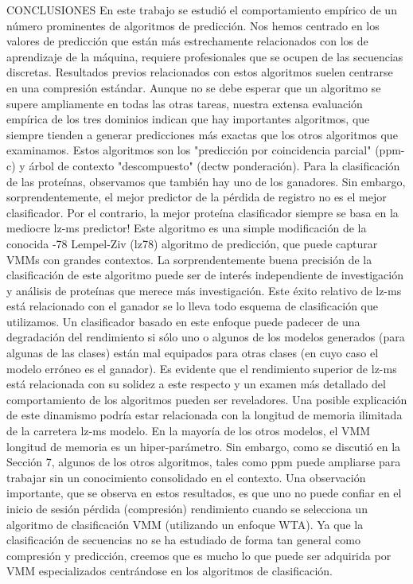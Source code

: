 CONCLUSIONES
En este trabajo se estudió el comportamiento empírico de un número  prominentes de algoritmos de predicción. Nos hemos centrado en los valores de predicción  que están más estrechamente relacionados con los de aprendizaje de la máquina, requiere profesionales que se ocupen de las secuencias discretas. Resultados previos relacionados con estos algoritmos suelen centrarse en una compresión estándar.
Aunque no se debe esperar que un algoritmo se supere ampliamente en todas las otras tareas, nuestra extensa evaluación empírica de los tres dominios indican que hay importantes algoritmos, que siempre tienden a generar predicciones más exactas que los otros algoritmos que examinamos. Estos algoritmos son los "predicción por coincidencia parcial" (ppm-c) y árbol de contexto "descompuesto" (dectw ponderación).  Para la clasificación de las proteínas, observamos que también hay uno de los ganadores. Sin embargo, sorprendentemente, el mejor predictor de la pérdida de registro no es el mejor clasificador. Por el contrario, la mejor proteína clasificador siempre se basa en la mediocre lz-ms predictor! Este algoritmo es una simple modificación de la conocida -78 Lempel-Ziv (lz78) algoritmo de predicción, que puede capturar VMMs con grandes contextos. La sorprendentemente buena precisión de la clasificación de este algoritmo puede ser de interés independiente de investigación y análisis de proteínas que merece más investigación.
Este éxito relativo de lz-ms está relacionado con el ganador se lo lleva todo esquema de clasificación que utilizamos. Un clasificador basado en este enfoque puede padecer de una degradación del rendimiento si sólo uno o algunos de los modelos generados (para algunas de las clases) están mal equipados para otras clases (en cuyo caso el modelo erróneo es el ganador).  Es evidente que el rendimiento superior de lz-ms está relacionada con su solidez a este respecto y un examen más detallado del comportamiento de los algoritmos pueden ser reveladores. Una posible explicación de este dinamismo podría estar relacionada con la longitud de memoria ilimitada de la carretera lz-ms modelo. En la mayoría de los otros modelos, el VMM longitud de memoria es un hiper-parámetro. Sin embargo, como se discutió en la Sección 7, algunos de los otros algoritmos, tales como ppm puede ampliarse para trabajar sin un conocimiento consolidado en el contexto.
Una observación importante, que se observa en estos resultados, es que uno no puede confiar en el inicio de sesión pérdida (compresión) rendimiento cuando se selecciona un algoritmo de clasificación VMM (utilizando un enfoque WTA).  Ya que la clasificación de secuencias no se ha estudiado de forma tan general como compresión y predicción, creemos que es mucho lo que puede ser adquirida por VMM especializados centrándose en los algoritmos de clasificación.
